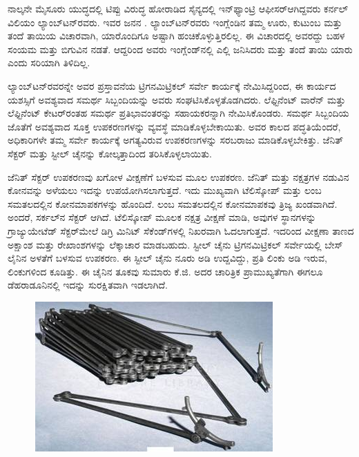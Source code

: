 ನಾಲ್ಕನೇ ಮೈಸೂರು ಯುದ್ಧದಲ್ಲಿ ಟಿಪ್ಪು ವಿರುದ್ಧ ಹೋರಾಡಿದ ಸೈನ್ಯದಲ್ಲಿ ಇನ್​ಫ್ಯಾಂಟ್ರಿ ಆಫೀಸರ್​ ಆಗಿದ್ದವರು ಕರ್ನಲ್​ ವಿಲಿಯಂ ಲ್ಯಾಂಬ್​ಟನ್​ರವರು. ಇವರ ಜನನ . ಲ್ಯಾಂಬ್​ಟನ್​ರವರು ಇಂಗ್ಲೆಂಡಿನ ತಮ್ಮ ಊರು, ಕುಟುಂಬ ಮತ್ತು ತಂದೆ ತಾಯಿಯ ವಿಚಾರವಾಗಿ, ಯಾರೊಂದಿಗೂ ಅಷ್ಟಾಗಿ ಹಂಚಿಕೊಳ್ಳುತ್ತಿರಲಿಲ್ಲ. ಈ ವಿಚಾರದಲ್ಲಿ ಅವರದ್ದು ಬಹಳ ಸಂಯಮ ಮತ್ತು ಬಿಗುವಿನ ನಡತೆ. ಆದ್ದರಿಂದ ಅವರು ಇಂಗ್ಲೆಂಡ್​ನಲ್ಲಿ ಎಲ್ಲಿ ಜನಿಸಿದರು ಮತ್ತು ತಂದೆ ತಾಯಿ ಯಾರು ಎಂದು ಸರಿಯಾಗಿ ತಿಳಿದಿಲ್ಲ.

ಲ್ಯಾಂಬ್​ಟನ್​ರವರನ್ನೇ ಅವರ ಪ್ರಸ್ತಾವನೆಯ ಟ್ರಿಗನಮಿಟ್ರಿಕಲ್​ ಸರ್ವೇ ಕಾರ್ಯಕ್ಕೆ ನೇಮಿಸಿದ್ದರಿಂದ, ಈ ಕಾರ್ಯದ ಯಶಸ್ಸಿಗೆ ಅವಶ್ಯವಾದ ಸಮರ್ಥ ಸಿಬ್ಬಂದಿಯನ್ನು ಅವರು ಸಂಘಟಿಸಿಕೊಳ್ಳತೊಡಗಿದರು. ಲೆಫ್ಟಿನೆಂಟ್​ ವಾರೆನ್​ ಮತ್ತು ಲೆಫ್ಟಿನೆಂಟ್​ ಕೇಟರ್​ರಂತಹ ಸಮರ್ಥ ಪ್ರತಿಭಾವಂತರನ್ನು ಸಹಾಯಕರನ್ನಾಗಿ ನೇಮಿಸಿಕೊಂಡರು. ಸಮರ್ಥ ಸಿಬ್ಬಂದಿಯ ಜೊತೆಗೆ ಅವಶ್ಯವಾದ ಸೂಕ್ತ ಉಪಕರಣಗಳನ್ನು ವ್ಯವಸ್ಥೆ ಮಾಡಿಕೊಳ್ಳಬೇಕಾಯಿತು. ಅವರ ಕಾಲದ ಪದ್ಧತಿಯೆಂದರೆ, ಅಧಿಕಾರಿಗಳೇ ತಮ್ಮ ಸರ್ವೇ ಕಾರ್ಯಕ್ಕೆ ಅಗತ್ಯವಿರುವ ಉಪಕರಣಗಳನ್ನು ಸರಬರಾಜು ಮಾಡಿಕೊಳ್ಳಬೇಕಿತ್ತು. ಜೆನಿತ್​ ಸೆಕ್ಟರ್​ ಮತ್ತು ಸ್ಟೀಲ್​ ಚೈನನ್ನು ಕೋಲ್ಕತ್ತಾದಿಂದ ತರಿಸಿಕೊಳ್ಳಲಾಯಿತು.

ಜೆನಿತ್​ ಸೆಕ್ಟರ್​ ಉಪಕರಣವು ಖಗೋಳ ವೀಕ್ಷಣೆಗೆ ಬಳಸುವ ಮೂಲ ಉಪಕರಣ. ಜೆನಿತ್​ ಮತ್ತು ನಕ್ಷತ್ರಗಳ ನಡುವಿನ ಕೋನವನ್ನು ಅಳೆಯಲು ಇದನ್ನು ಉಪಯೋಗಿಸಲಾಗುತ್ತದೆ. ಇದು ಮುಖ್ಯವಾಗಿ ಟೆಲಿಸ್ಕೋಪ್​ ಮತ್ತು ಲಂಬ ಸಮತಲದಲ್ಲಿನ ಕೋನಮಾಪಕಗಳನ್ನು ಹೊಂದಿದೆ. ಲಂಬ ಸಮತಲದಲ್ಲಿನ ಕೋನಮಾಪಕವು ತ್ರಿಜ್ಯ ಖಂಡವಾಗಿದೆ. ಅಂದರೆ, ಸರ್ಕಲ್​ನ ಸೆಕ್ಟರ್​ ಆಗಿದೆ. ಟೆಲಿಸ್ಕೋಪ್​ ಮೂಲಕ ನಕ್ಷತ್ರ ವೀಕ್ಷಣೆ ಮಾಡಿ, ಅವುಗಳ ಸ್ಥಾನಗಳನ್ನು ಗ್ರಾಜ್ಯುಯೇಟೆಡ್​ ಸೆಕ್ಟರ್​ ಮೇಲೆ ಡಿಗ್ರಿ ಮಿನಿಟ್​ ಸೆಕೆಂಡ್​ಗಳಲ್ಲಿ ನಿಖರವಾಗಿ ಓದಲಾಗುತ್ತದೆ. ಇದರಿಂದ ವೀಕ್ಷಣಾ ತಾಣದ ಅಕ್ಷಾಂಶ ಮತ್ತು ರೇಖಾಂಶಗಳನ್ನು ಲೆಕ್ಕಾಚಾರ ಮಾಡಬಹುದು. ಸ್ಟೀಲ್​ ಚೈನು ಟ್ರಿಗನಮಿಟ್ರಿಕಲ್​ ಸರ್ವೇಯಲ್ಲಿ ಬೇಸ್​ಲೈನಿನ ಅಳತೆಗೆ ಬಳಸುವ ಉಪಕರಣ. ಈ ಸ್ಟೀಲ್​ ಚೈನು ನೂರು ಅಡಿ ಉದ್ದವಿದ್ದು, ಪ್ರತಿ ಲಿಂಕು  ಅಡಿ ಇರುವ,  ಲಿಂಕುಗಳಿಂದ ಕೂಡಿತ್ತು. ಈ ಚೈನಿನ ತೂಕವು ಸುಮಾರು  ಕೆ.ಜಿ. ಅದರ ಚಾರಿತ್ರಿಕ ಪ್ರಾಮುಖ್ಯತೆಗಾಗಿ ಈಗಲೂ ಡೆಹರಾಡೂನಿನಲ್ಲಿ ಇದನ್ನು ಸುರಕ್ಷಿತವಾಗಿ ಇಡಲಾಗಿದೆ.

\begin{figure}
\includegraphics[scale=0.6]{"images/image006.jpg"}
\end{figure}

